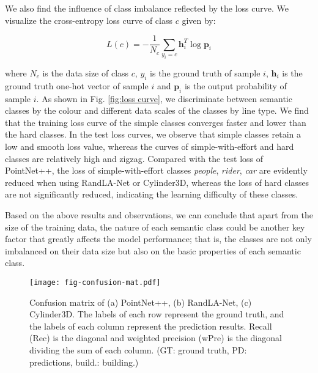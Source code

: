 \documentclass[journal]{IEEEtran}
\begin{document}

We also find the influence of class imbalance reflected by the loss curve. We visualize the cross-entropy loss curve of class $c$ given by:

\vspace{-1mm}
\begin{equation}
L(c) = -\frac{1}{N_c}\sum_{y_{i}=c} {\bm h}_i^T \log{ {\bm p}_i}
\end{equation}

where $N_c$ is the data size of class $c$, $y_{i}$ is the ground truth of sample $i$, ${\bm h}_i$ is the ground truth one-hot vector of sample $i$ and ${\bm p}_i$ is the output probability of sample $i$.
As shown in Fig. \ref{fig:loss curve}, we discriminate between semantic classes by the colour and different data scales of the classes by line type. We find that the training loss curve of the simple classes converges faster and lower than the hard classes. In the test loss curves, we observe that simple classes retain a low and smooth loss value, whereas the curves of simple-with-effort and hard classes are relatively high and zigzag. Compared with the test loss of PointNet++, the loss of simple-with-effort classes \textit{people}, \textit{rider}, \textit{car} are evidently reduced when using RandLA-Net or Cylinder3D, whereas the loss of hard classes are not significantly reduced, indicating the learning difficulty of these classes.

Based on the above results and observations, we can conclude that apart from the size of the training data, the nature of each semantic class could be another key factor that greatly affects the model performance; that is, the classes are not only imbalanced on their data size but also on the basic properties of each semantic class.

\begin{figure*}[t]
	\centering
	\texttt{[image: fig-confusion-mat.pdf]}
	\vspace{-4mm}
	\caption{Confusion matrix of (a) PointNet++, (b) RandLA-Net, (c) Cylinder3D. The labels	of each row represent the ground truth, and the labels of each column represent the prediction results. Recall (Rec) is the diagonal and weighted precision (wPre) is the diagonal dividing the sum of each column. (GT: ground truth, PD: predictions, build.: building.)}
	\label{fig:confusion mat}
	\vspace{-4mm}
\end{figure*}
\end{document}
